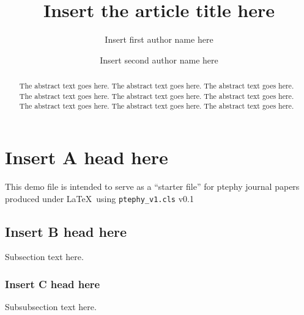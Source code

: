 \documentclass[preprint,pteplogo]{ptephy_v2}%
\begin{document}
\title{Insert the article title here}


\author{Insert first author name here}

\author{Insert second author name here}




\begin{abstract}%
The abstract text goes here. The abstract text goes here. The abstract text goes here.
The abstract text goes here. The abstract text goes here. The abstract text goes here.
The abstract text goes here. The abstract text goes here. The abstract text goes here.
\end{abstract}


\maketitle


\section{Insert A head here}
This demo file is intended to serve as a ``starter file''
for ptephy journal papers produced under \LaTeX\ using
\verb+ptephy_v1.cls+ v0.1

\subsection{Insert B head here}
Subsection text here.

\subsubsection{Insert C head here}
Subsubsection text here.
\end{document}
